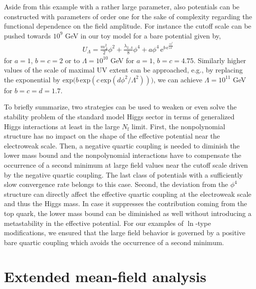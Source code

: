 \documentclass[twocolumn,aps,prd,showpacs,nofootinbib,superscriptaddress,preprintnumbers,floatfix,10pt]{revtex4-1}
\newcommand{\E}{\mathrm{e}}
\newcommand{\Nf}{N_{\mathrm{f}}}
\newcommand{\UL}{U_{\Lambda}}
\newcommand{\mL}{m_\Lambda^2}
\newcommand{\lL}{\lambda_{2,\Lambda}}
\begin{document}
Aside from this example with a rather large parameter, also potentials can be constructed with parameters of order one for the sake of complexity regarding the functional dependence on the field amplitude. For instance the cutoff scale can be pushed towards $10^{9}$ GeV in our toy model for a bare potential given by,
%
\begin{align}
 \UL = \frac{\mL}{2}\phi^{2} + \frac{\lL}{8}\phi^{4} + a \phi^{4}\, \E^{b\, \E^{\frac{c \phi^2}{2\Lambda^{2}} }}
\end{align}
%
for $a=1$, $b=c=2$ or to $\Lambda = 10^{10}$ GeV for $a=1$, $b=c=4.75$. Similarly higher values of the scale of maximal UV extent can be approached, e.g., by replacing the exponential by $\mathrm{exp}\big(b\, \mathrm{exp}(c\, \mathrm{exp}(d \phi^{2}/\Lambda^{2}))\big)$, we can achieve $\Lambda=10^{11}$ GeV for $b=c=d=1.7$.


To briefly summarize, two strategies can be used to weaken or even solve the stability problem of the standard model Higgs sector in terms of generalized Higgs interactions at least in the large $\Nf$ limit.
First, the nonpolynomial structure has no impact on the shape of the effective potential near the electroweak scale. Then, a negative quartic coupling is needed to diminish the lower mass bound and the nonpolynomial interactions have to compensate the occurrence of a second minimum at large field values near the cutoff scale driven by the negative quartic coupling. The last class of potentials with a sufficiently slow convergence rate belongs to this case.
Second, the deviation from the $\phi^{4}$ structure can directly affect the effective quartic coupling at the electroweak scale and thus the Higgs mass. In case it suppresses the contribution coming from the top quark, the lower mass bound can be diminished as well without introducing a metastability in the effective potential. For our examples of $\ln$-type modifications, we ensured that the large field behavior is governed by a positive bare quartic coupling which avoids the occurrence of a second minimum.
















 


\section{Extended mean-field analysis}
\label{sec:EMF}
\end{document}

